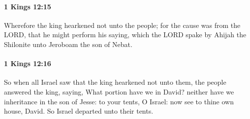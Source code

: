 		\paragraph{1 Kings 12:15} %
			\label{1KINGS-12-15}

			Wherefore the king hearkened not unto the people; for the cause was from the LORD, that he might perform his saying, which the LORD spake by Ahijah the Shilonite unto Jeroboam the son of Nebat.


		\paragraph{1 Kings 12:16} %
			\label{1KINGS-12-16}

			So when all Israel saw that the king hearkened not unto them, the people answered the king, saying, What portion have we in David? neither have we inheritance in the son of Jesse: to your tents, O Israel: now see to thine own house, David. So Israel departed unto their tents.

